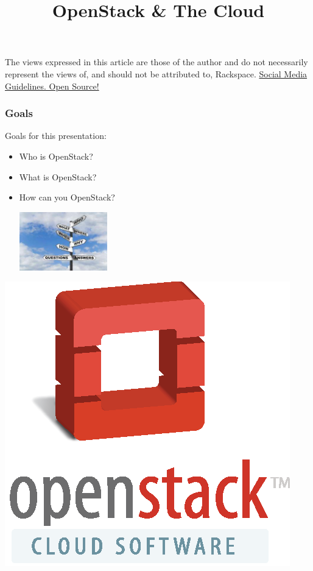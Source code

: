 

\title[]{OpenStack \& The Cloud}



\frame{\titlepage}

\begin{frame}
The views expressed in this article are those of the author and do not necessarily represent the views of, and should not be attributed to, Rackspace.
\href{https://github.com/rackspace/social\_media\_guidelines}{Social Media Guidelines. Open Source!}
\end{frame}

\begin{frame}
\frametitle{Goals}

Goals for this presentation:
\begin{itemize}
\item Who is OpenStack?
\item What is OpenStack?
\item How can you OpenStack? \\ \medskip
\begin{center} \includegraphics[width=108pt]{images/sign-posts-contact-info.jpg} \end{center}
\end{itemize}

\end{frame}

\begin{frame}
\begin{center}
\includegraphics{images/openstack-cloud-software-vertical-cmyk.eps}
\end{center}
\end{frame}

